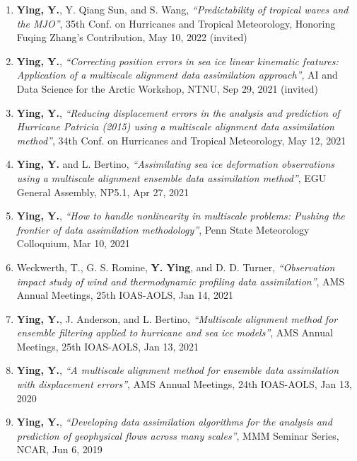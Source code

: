 \begin{enumerate}
\item \textbf{Ying, Y.}, Y. Qiang Sun, and S. Wang,
\textit{``Predictability of tropical waves and the MJO''},
35th Conf. on Hurricanes and Tropical Meteorology, Honoring Fuqing Zhang’s Contribution, May 10, 2022
(invited)

\item \textbf{Ying, Y.},
\textit{``Correcting position errors in sea ice linear kinematic features: Application of a multiscale alignment data assimilation approach''},
AI and Data Science for the Arctic Workshop, NTNU, Sep 29, 2021
(invited)

\item \textbf{Ying, Y.},
\textit{``Reducing displacement errors in the analysis and prediction of Hurricane Patricia (2015) using a multiscale alignment data assimilation method''},
34th Conf. on Hurricanes and Tropical Meteorology, May 12, 2021

\item \textbf{Ying, Y.} and L. Bertino,
\textit{``Assimilating sea ice deformation observations using a multiscale alignment ensemble data assimilation method''},
EGU General Assembly, NP5.1, Apr 27, 2021

\item \textbf{Ying, Y.},
\textit{``How to handle nonlinearity in multiscale problems: Pushing the frontier of data assimilation methodology''},
Penn State Meteorology Colloquium, Mar 10, 2021

\item Weckwerth, T., G. S. Romine, \textbf{Y. Ying}, and D. D. Turner,
\textit{``Observation impact study of wind and thermodynamic profiling data assimilation''},
AMS Annual Meetings, 25th IOAS-AOLS, Jan 14, 2021

\item \textbf{Ying, Y.}, J. Anderson, and L. Bertino,
\textit{``Multiscale alignment method for ensemble filtering applied to hurricane and sea ice models''},
AMS Annual Meetings, 25th IOAS-AOLS, Jan 13, 2021

\item \textbf{Ying, Y.},
\textit{``A multiscale alignment method for ensemble data assimilation with displacement errors''},
AMS Annual Meetings, 24th IOAS-AOLS, Jan 13, 2020

\item \textbf{Ying, Y.},
\textit{``Developing data assimilation algorithms for the analysis and prediction of geophysical flows across many scales''},
MMM Seminar Series, NCAR, Jun 6, 2019


\end{enumerate}
